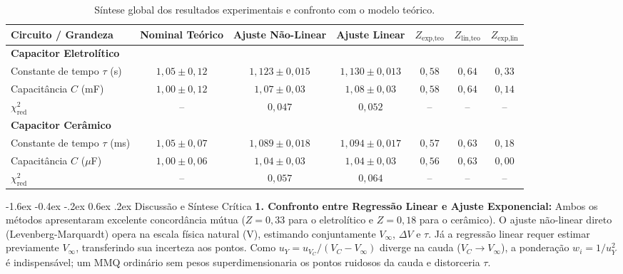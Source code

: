 \documentclass[12pt, a4paper]{article}
\makeatletter
\renewcommand\section{\@startsection {section}{1}{\z@}%
                                   {-1.6ex \@plus -0.4ex \@minus -.2ex}%
                                   {0.6ex \@plus .2ex}%
                                   {\normalfont\large\bfseries}}
\makeatother
\begin{document}
\begin{table}[H]
    \centering
    \caption{Síntese global dos resultados experimentais e confronto com o modelo teórico.}
    \label{tab:sintese}
    \vspace{-0.15cm}
    \scriptsize
    \setlength{\tabcolsep}{3.2pt}
    \renewcommand{\arraystretch}{0.92}
    \begin{tabular}{@{}lcccccc@{}}
        \toprule
        \textbf{Circuito / Grandeza} & \textbf{Nominal Teórico} & \textbf{Ajuste Não-Linear} & \textbf{Ajuste Linear} & \textbf{$Z_{\text{exp,teo}}$} & \textbf{$Z_{\text{lin,teo}}$} & \textbf{$Z_{\text{exp,lin}}$} \\
        \midrule
        \textbf{Capacitor Eletrolítico} & & & & & & \\
        Constante de tempo $\tau$ (s) & $1{,}05 \pm 0{,}12$ & $1{,}123 \pm 0{,}015$ & $1{,}130 \pm 0{,}013$ & $0{,}58$ & $0{,}64$ & $0{,}33$ \\
        Capacitância $C$ (mF) & $1{,}00 \pm 0{,}12$ & $1{,}07 \pm 0{,}03$ & $1{,}08 \pm 0{,}03$ & $0{,}58$ & $0{,}64$ & $0{,}14$ \\
        $\chi^2_{\text{red}}$ & -- & $0{,}047$ & $0{,}052$ & -- & -- & -- \\
        \midrule
        \textbf{Capacitor Cerâmico} & & & & & & \\
        Constante de tempo $\tau$ (ms) & $1{,}05 \pm 0{,}07$ & $1{,}089 \pm 0{,}018$ & $1{,}094 \pm 0{,}017$ & $0{,}57$ & $0{,}63$ & $0{,}18$ \\
        Capacitância $C$ ($\mu$F) & $1{,}00 \pm 0{,}06$ & $1{,}04 \pm 0{,}03$ & $1{,}04 \pm 0{,}03$ & $0{,}56$ & $0{,}63$ & $0{,}00$ \\
        $\chi^2_{\text{red}}$ & -- & $0{,}057$ & $0{,}064$ & -- & -- & -- \\
        \bottomrule
    \end{tabular}
    \vspace{-0.2cm}
\end{table}

\vspace{-0.3cm}
\section{Discussão e Síntese Crítica}
\vspace{-0.15cm}
\noindent\textbf{1. Confronto entre Regressão Linear e Ajuste Exponencial:}
Ambos os métodos apresentaram excelente concordância mútua ($Z = 0{,}33$ para o eletrolítico e $Z = 0{,}18$ para o cerâmico). O ajuste não-linear direto (Levenberg-Marquardt) opera na escala física natural ($\text{V}$), estimando conjuntamente $V_{\infty}$, $\Delta V$ e $\tau$. Já a regressão linear requer estimar previamente $V_{\infty}$, transferindo sua incerteza aos pontos. Como $u_Y = u_{V_C}/(V_C - V_{\infty})$ diverge na cauda ($V_C \to V_{\infty}$), a ponderação $w_i = 1/u_Y^2$ é indispensável; um MMQ ordinário sem pesos superdimensionaria os pontos ruidosos da cauda e distorceria $\tau$.
\end{document}
